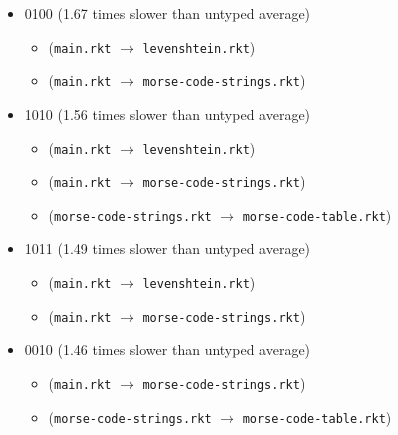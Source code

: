 \documentclass{article}
\newcommand{\mono}[1]{\texttt{#1}}
\begin{document}
\begin{itemize}
\begin{itemize}
  \end{itemize}
\item 0100 (1.67 times slower than untyped average)
  \begin{itemize}
  \item (\mono{main.rkt} $\rightarrow$ \mono{levenshtein.rkt})
  \item (\mono{main.rkt} $\rightarrow$ \mono{morse-code-strings.rkt})
  \end{itemize}
\item 1010 (1.56 times slower than untyped average)
  \begin{itemize}
  \item (\mono{main.rkt} $\rightarrow$ \mono{levenshtein.rkt})
  \item (\mono{main.rkt} $\rightarrow$ \mono{morse-code-strings.rkt})
  \item (\mono{morse-code-strings.rkt} $\rightarrow$ \mono{morse-code-table.rkt})
  \end{itemize}
\item 1011 (1.49 times slower than untyped average)
  \begin{itemize}
  \item (\mono{main.rkt} $\rightarrow$ \mono{levenshtein.rkt})
  \item (\mono{main.rkt} $\rightarrow$ \mono{morse-code-strings.rkt})
  \end{itemize}
\item 0010 (1.46 times slower than untyped average)
  \begin{itemize}
  \item (\mono{main.rkt} $\rightarrow$ \mono{morse-code-strings.rkt})
  \item (\mono{morse-code-strings.rkt} $\rightarrow$ \mono{morse-code-table.rkt})
  \end{itemize}


\end{itemize}
\end{document}

